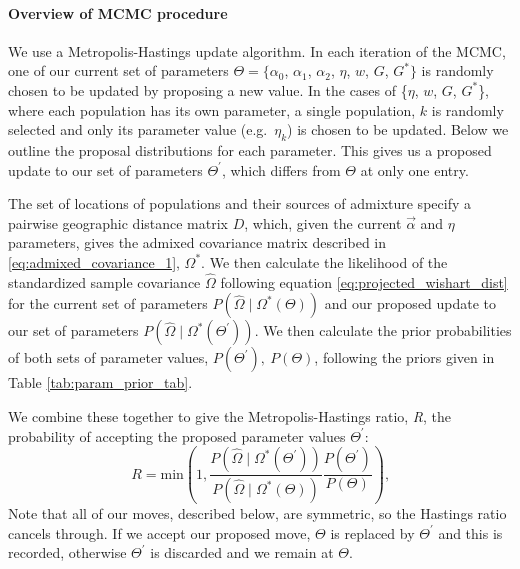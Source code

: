 \documentclass[12pt]{article}
\newcommand{\identifyadmixsource}[1]{{#1^{*}}}
\begin{document}
\paragraph{Overview of MCMC procedure}
We use a Metropolis-Hastings update algorithm. 
In each iteration of the MCMC, one of our current set of parameters 
$\Theta= \{\alpha_0$, $\alpha_1$, $\alpha_2$, $\eta$, $w$, $G$, $\identifyadmixsource{G}\}$ 
is randomly chosen to be updated by proposing a new value.  
In the cases of \{$\eta$, $w$, $G$, $\identifyadmixsource{G}$\}, where each population has its own parameter, a single population, $k$ 
is randomly selected and only its parameter value (e.g.\ $\eta_k$) is chosen to be updated. 
Below we outline the proposal distributions for each parameter. 
This gives us a proposed update to our set of parameters $\Theta^{\prime}$, which differs from $\Theta$ at only one entry.

The set of locations of populations and their sources of admixture specify a pairwise geographic distance matrix $D$, 
which, given the current $\vec{\alpha}$ and $\eta$ parameters, 
gives the admixed covariance matrix described in \eqref{eq:admixed_covariance_1}, $\identifyadmixsource{\Omega}$.  
We then calculate the likelihood of the standardized sample covariance $\widehat{\Omega}$ 
following equation \eqref{eq:projected_wishart_dist} for the current set of parameters 
$P(\widehat{\Omega} \mid \identifyadmixsource{\Omega}(\Theta))$ and our proposed update to our set of parameters 
$P(\widehat{\Omega} \mid \identifyadmixsource{\Omega}(\Theta^{\prime}))$. 
We then calculate the prior probabilities of both sets of parameter values, $P(\Theta^{\prime}),~P(\Theta) $, 
following the priors given in Table \ref{tab:param_prior_tab}.




We combine these together to give the Metropolis-Hastings ratio, \emph{R}, the probability of accepting the proposed parameter values $\Theta^{\prime}$:
\begin{equation}
R = \text{min}\left(1, \frac{P(\widehat{\Omega} \mid \identifyadmixsource{\Omega}(\Theta^{\prime}))} {P(\widehat{\Omega} \mid \identifyadmixsource{\Omega}(\Theta))} 
				\frac{P(\Theta^{\prime})}{P(\Theta)} 	\right) \text{,}
\label{eq:MH_algorithm}
\end{equation}
Note that all of our moves, described below, are symmetric, so the Hastings ratio cancels through. If we accept our proposed move, $\Theta$ is replaced by $\Theta^{\prime}$ and this is recorded, otherwise $\Theta^{\prime}$ is discarded and we remain at $\Theta$. 
\end{document}
